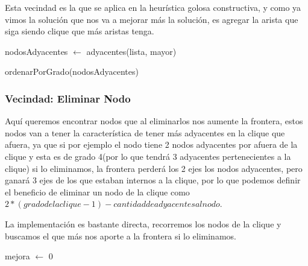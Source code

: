 Esta vecindad es la que se aplica en la heurística golosa constructiva, y como ya vimos la solución que nos va a mejorar más la solución, es agregar la arista que siga siendo clique que más aristas tenga.

\begin{algorithm}[H]
	\NoCaptionOfAlgo
	\caption{}

    nodosAdyacentes $\leftarrow$ adyacentes(lista, mayor)

    ordenarPorGrado(nodosAdyacentes)

\end{algorithm}

\subsubsection{Vecindad: Eliminar Nodo}

Aquí queremos encontrar nodos que al eliminarlos nos aumente la frontera, estos nodos van a tener la característica de tener más adyacentes en la clique que afuera, ya que si por ejemplo el nodo tiene 2 nodos adyacentes por afuera de la clique y esta es de grado 4(por lo que tendrá 3 adyacentes pertenecientes a la clique) si lo eliminamos, la frontera perderá los 2 ejes los nodos adyacentes, pero ganará 3 ejes de los que estaban internos a la clique, por lo que podemos definir el beneficio de eliminar un nodo de la clique como $2 * (grado de la clique - 1) - cantidad de adyacentes al nodo$.

La implementación es bastante directa, recorremos los nodos de la clique y buscamos el que más nos aporte a la frontera si lo eliminamos.

\begin{algorithm}[H]
	\NoCaptionOfAlgo
	\caption{}

    mejora $\leftarrow$ 0



\end{algorithm}

